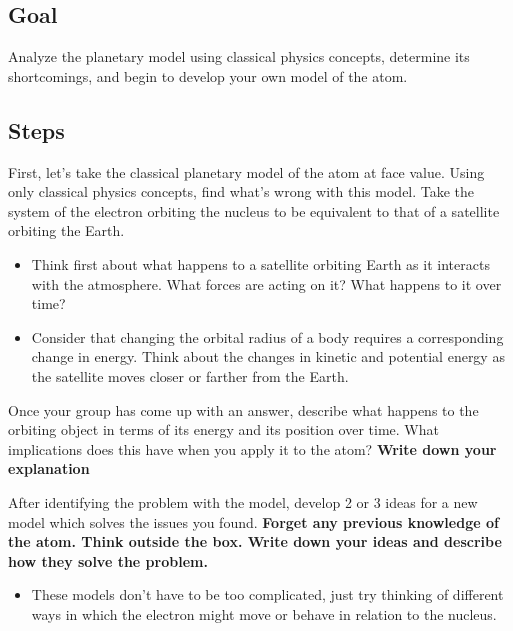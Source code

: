 \subsection{Goal} 
Analyze the planetary model using classical physics concepts, determine its shortcomings, and begin to develop your own model of the atom. 

\subsection{Steps}

\begin{steps} 
	\item First, let's take the classical planetary model of the atom at face value. Using only classical physics concepts, find what's wrong with this model. Take the system of the electron orbiting the nucleus to be equivalent to that of a satellite orbiting the Earth. 
	\begin{itemize} 
		\item Think first about what happens to a satellite orbiting Earth as it interacts with the atmosphere. What forces are acting on it? What happens to it over time?
		
		\item Consider that changing the orbital radius of a body requires a corresponding change in energy. Think about the changes in kinetic and potential energy as the satellite moves closer or farther from the Earth. 
	\end{itemize}

	\item Once your group has come up with an answer, describe what happens to the orbiting object in terms of its energy and its position over time. What implications does this have when you apply it to the atom? \textbf{Write down your explanation}
	
	\item After identifying the problem with the model, develop 2 or 3 ideas for a new model which solves the issues you found. \textbf{Forget any previous knowledge of the atom. Think outside the box. Write down your ideas and describe how they solve the problem.} 
	\begin{itemize}
		\item These models don't have to be too complicated, just try thinking of different ways in which the electron might move or behave in relation to the nucleus.
	\end{itemize} 
\end{steps}

